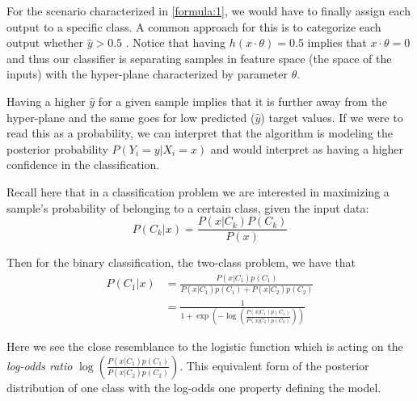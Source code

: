 For the scenario characterized in \cref{formula:1}, we would have to finally assign each output to a specific class.
A common approach for this is to categorize each output whether $\hat{y} > 0.5$ \label{formula:logitThreshold}.
Notice that having $h(x \cdot \theta) = 0.5$ implies that $x \cdot \theta = 0$ and thus our classifier is separating samples in feature space (the space of the inputs) with the hyper-plane characterized by parameter $\theta$.

Having a higher $\hat{y}$ for a given sample implies that it is further away from the hyper-plane and the same goes for low predicted ($\hat{y}$) target values.
If we were to read this as a probability, we can interpret that the algorithm is modeling the posterior probability $P(Y_i = y | X_i = x)$ and would interpret as having a higher confidence in the classification.






Recall here that in a classification problem we are interested in maximizing a sample's probability of belonging to a certain class, given the input data:
\begin{equation}
P(C_k| x) = \frac{P(x|C_k)P(C_k)}{P(x)}
\end{equation}

Then for the binary classification, the two-class problem, we have that
\begin{equation}
\begin{split}
P(C_1| x) & = \frac{P(x|C_1)p(C_1) }{P(x|C_1)p(C_1) + P(x|C_2)p(C_2)} \\
& = \frac{1 }
{1 + \exp \left(- \log \left(  \frac{ P(x|C_1)p(C_1)}
{P(x|C_2)p(C_2)
} \right) \right)
}
\end{split}
\end{equation}

Here we see the close resemblance to the logistic function which is acting on the \textit{log-odds ratio} $ \log \left(  \frac{ P(x|C_1)p(C_1)}{P(x|C_2)p(C_2) } \right)$.
This equivalent form of the posterior distribution of one class with the log-odds one property defining the model.


